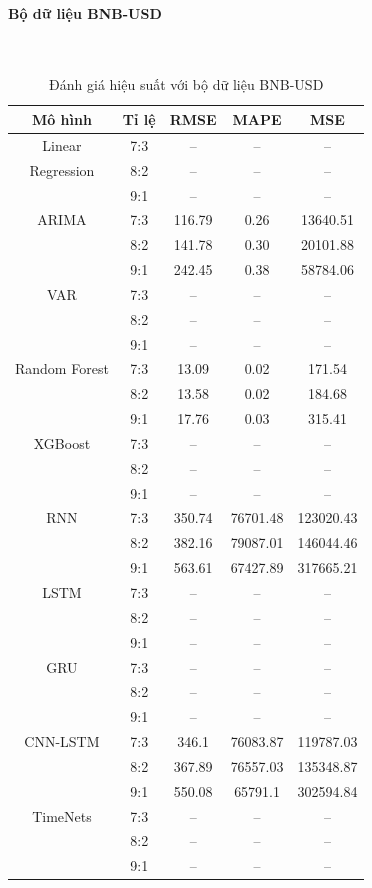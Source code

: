 \documentclass[conference]{IEEEtran}
\begin{document}
\paragraph{\textbf{Bộ dữ liệu BNB-USD}} \mbox{} \\
\begin{table}[H]
	\centering
	\caption{Đánh giá hiệu suất với bộ dữ liệu BNB-USD}
	\begin{tabular}{|c|c|c|c|c|}
		\hline
		Mô hình & Tỉ lệ & RMSE & MAPE & MSE \\ \hline
		Linear & 7:3 & -- & -- & -- \\
		Regression & 8:2 & -- & -- & -- \\
		& 9:1 & -- & -- & -- \\ \hline
		ARIMA & 7:3 & 116.79& 0.26 & 13640.51 \\
		& 8:2 & 141.78 & 0.30 & 20101.88 \\
		& 9:1 & 242.45 & 0.38 & 58784.06 \\ \hline
		VAR & 7:3 & -- & -- & -- \\
		& 8:2 & -- & -- & -- \\
		& 9:1 & -- & -- & -- \\ \hline
		Random Forest & 7:3 & 13.09 & 0.02 & 171.54 \\
		& 8:2 & 13.58 & 0.02 & 184.68 \\
		& 9:1 & 17.76 & 0.03 & 315.41 \\ \hline
		XGBoost & 7:3 & -- & -- & -- \\
		& 8:2 & -- & -- & -- \\
		& 9:1 & -- & -- & -- \\ \hline
		RNN & 7:3 & 350.74 & 76701.48 & 123020.43 \\
		& 8:2 & 382.16 & 79087.01 & 146044.46 \\
		& 9:1 & 563.61 & 67427.89 & 317665.21 \\ \hline
		LSTM & 7:3 & -- & -- & -- \\
		& 8:2 & -- & -- & -- \\
		& 9:1 & -- & -- & -- \\ \hline
		GRU & 7:3 & -- & -- & -- \\
		& 8:2 & -- & -- & -- \\
		& 9:1 & -- & -- & -- \\ \hline
		CNN-LSTM & 7:3 & 346.1 & 76083.87 & 119787.03 \\
		& 8:2 & 367.89 & 76557.03 & 135348.87 \\
		& 9:1 & 550.08 & 65791.1 & 302594.84 \\ \hline
		TimeNets & 7:3 & -- & -- & -- \\
		& 8:2 & -- & -- & -- \\
		& 9:1 & -- & -- & -- \\ \hline
	\end{tabular}
\end{table}
\end{document}
